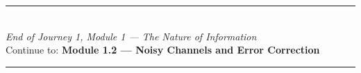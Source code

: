 \vspace{1.4cm}
\begin{center}
{\color{CompBlue}\rule{0.5\linewidth}{0.8pt}}\\[6pt]
{\small\color{DarkGrey}\textit{End of Journey 1, Module 1 --- The Nature of Information}}\\[4pt]
{\small\color{DarkGrey}Continue to: \textbf{Module 1.2 --- Noisy Channels and Error Correction}}\\[6pt]
{\color{CompBlue}\rule{0.5\linewidth}{0.8pt}}
\end{center}


